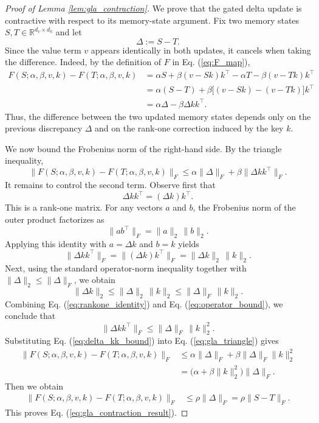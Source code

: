 \begin{proof}[Proof of Lemma \ref{lem:gla_contraction}]
We prove that the gated delta update is contractive with respect to its memory-state argument.
Fix two memory states $S,T \in \mathbb R^{d_v\times d_k}$ and let
\[
\Delta := S-T.
\]
Since the value term $v$ appears identically in both updates, it cancels when taking the difference.
Indeed, by the definition of $F$ in Eq. (\ref{eq:F_map}),
\begin{align}
F(S;\alpha,\beta,v,k)-F(T;\alpha,\beta,v,k)
&=
\alpha S + \beta (v-Sk)k^\top
-\alpha T - \beta (v-Tk)k^\top
\nonumber\\
&=
\alpha(S-T)+\beta\bigl[(v-Sk)-(v-Tk)\bigr]k^\top
\nonumber\\
&=
\alpha\Delta-\beta\Delta kk^\top.
\label{eq:gla_diff_expand}
\end{align}
Thus, the difference between the two updated memory states depends only on the previous discrepancy
$\Delta$ and on the rank-one correction induced by the key $k$.

We now bound the Frobenius norm of the right-hand side. By the triangle inequality,
\begin{equation}
\|F(S;\alpha,\beta,v,k)-F(T;\alpha,\beta,v,k)\|_F
\le
\alpha\|\Delta\|_F+\beta\|\Delta kk^\top\|_F.
\label{eq:gla_triangle}
\end{equation}
It remains to control the second term. Observe first that
\[
\Delta kk^\top = (\Delta k)k^\top.
\]
This is a rank-one matrix. For any vectors $a$ and $b$, the Frobenius norm of the outer product
factorizes as
\[
\|ab^\top\|_F = \|a\|_2\,\|b\|_2.
\]
Applying this identity with $a=\Delta k$ and $b=k$ yields
\begin{equation}
\|\Delta kk^\top\|_F
=
\|(\Delta k)k^\top\|_F
=
\|\Delta k\|_2\,\|k\|_2.
\label{eq:rankone_identity}
\end{equation}
Next, using the standard operator-norm inequality together with
$\|\Delta\|_2 \le \|\Delta\|_F$, we obtain
\begin{equation}
\|\Delta k\|_2
\le
\|\Delta\|_2\,\|k\|_2
\le
\|\Delta\|_F\,\|k\|_2.
\label{eq:operator_bound}
\end{equation}
Combining Eq. (\ref{eq:rankone_identity}) and Eq. (\ref{eq:operator_bound}), we conclude that
\begin{equation}
\|\Delta kk^\top\|_F
\le
\|\Delta\|_F\,\|k\|_2^2.
\label{eq:delta_kk_bound}
\end{equation}
Substituting Eq. (\ref{eq:delta_kk_bound}) into Eq. (\ref{eq:gla_triangle}) gives
\begin{align}
\|F(S;\alpha,\beta,v,k)-F(T;\alpha,\beta,v,k)\|_F
&\le
\alpha\|\Delta\|_F+\beta\|\Delta\|_F\|k\|_2^2
\nonumber\\
&=
\bigl(\alpha+\beta\|k\|_2^2\bigr)\|\Delta\|_F.
\end{align}
Then we obtain
\begin{align}
\|F(S;\alpha,\beta,v,k)-F(T;\alpha,\beta,v,k)\|_F
&\le
\rho\|\Delta\|_F
=
\rho\|S-T\|_F.
\end{align}
This proves Eq. (\ref{eq:gla_contraction_result}).
\end{proof}
